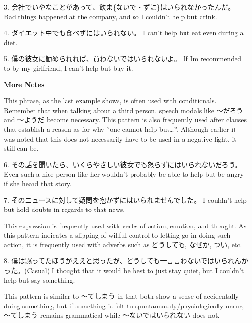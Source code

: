 \par{3. 会社でいやなことがあって、飲ま\{ないで・ずに\}はいられなかったんだ。 \hfill\break
Bad things happened at the company, and so I couldn't help but drink. }

\par{4. ダイエット中でも食べずにはいられない。 \hfill\break
I can't help but eat even during a diet. }

\par{5. 僕の彼女に勧められれば、買わないではいられないよ。 \hfill\break
If I\textquotesingle m recommended to by my girlfriend, I can't help but buy it. }

\begin{center}
 \textbf{More Notes }
\end{center}

\par{ This phrase, as the last example shows, is often used with conditionals. Remember that when talking about a third person, speech modals like ～だろう and ～ようだ become necessary. This pattern is also frequently used after clauses that establish a reason as for why “one cannot help but…”. Although earlier it was noted that this does not necessarily have to be used in a negative light, it still can be. }

\par{6. その話を聞いたら、いくらやさしい彼女でも怒らずにはいられないだろう。 \hfill\break
Even such a nice person like her wouldn't probably be able to help but be angry if she heard that story. }

\par{7. そのニュースに対して疑問を抱かずにはいられませんでした。 \hfill\break
I couldn't help but hold doubts in regards to that news. }

\par{ This expression is frequently used with verbs of action, emotion, and thought. As this pattern indicates a slipping of willful control to letting go in doing such action, it is frequently used with adverbs such as どうしても, なぜか, つい, etc. }

\par{8. 僕は黙ってたほうがええと思ったが、どうしても一言言わないではいられんかった。(Casual) \hfill\break
I thought that it would be best to just stay quiet, but I couldn't help but say something. }

\par{ This pattern is similar to ～てしまう in that both show a sense of accidentally doing something, but if something is felt to spontaneously\slash physiologically occur, ～てしまう remains grammatical while ～ないではいられない does not. }

